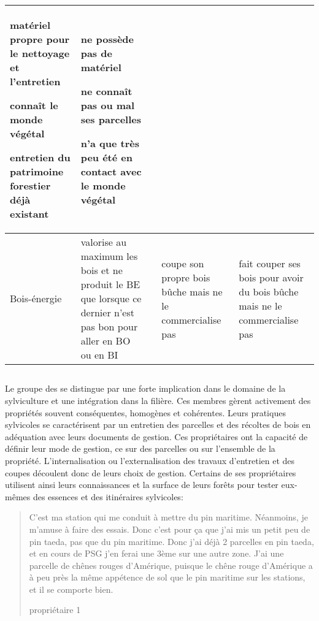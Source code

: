 \documentclass[12pt]{report}
\newcounter{table1}
\begin{document}
\begin{sidewaystable}
\begin{tabulary}{\columnwidth}{|p{28mm}|p{45mm}|p{45mm}|p{45mm}|p{45mm}|}
      \begin{compactitem}%
	\item matériel propre pour le nettoyage et l'entretien%
	\item connaît le monde végétal%
	\item entretien du patrimoine forestier déjà existant
      \end{compactitem}&%
      \begin{compactitem}%
	\item ne possède pas de matériel%
	\item ne connaît pas ou mal ses parcelles%
	\item n'a que très peu été en contact avec le monde végétal%
      \end{compactitem}\\%
    \hline Bois-énergie & valorise au maximum les bois et ne produit le BE que %
      lorsque ce dernier n'est pas bon pour aller en BO ou en BI&%
      &coupe son propre bois bûche mais ne le commercialise pas%
      &fait couper ses bois pour avoir du bois bûche mais ne le commercialise pas\\%
    \hline
  \end{tabulary}
\end{sidewaystable}

\subsection{}

Le groupe des  se distingue par une forte implication
dans le domaine de la sylviculture et une intégration dans la filière. Ces
membres gèrent activement des propriétés souvent conséquentes, homogènes et
cohérentes. Leurs pratiques sylvicoles se caractérisent par un entretien des
parcelles et des récoltes de bois en adéquation avec leurs documents de gestion.
Ces propriétaires ont la capacité de définir leur mode de gestion, ce sur des
parcelles ou sur l'ensemble de la propriété. L'internalisation ou
l'externalisation des travaux d'entretien et des coupes découlent donc de leurs
choix de gestion. Certains de ses propriétaires utilisent ainsi
leurs connaissances et la surface de leurs forêts pour tester eux-mêmes des
essences et des itinéraires sylvicoles:

\blockquote[propriétaire 1]{C’est ma
station qui me conduit à mettre du pin maritime. Néanmoins, je m’amuse à
faire des essais. Donc c’est pour ça que j’ai mis un petit peu de
pin taeda, pas que du pin maritime. Donc j’ai déjà 2 parcelles en pin taeda, et
en cours de PSG j’en ferai une 3ème sur une autre zone. J’ai une parcelle de
chênes rouges d’Amérique, puisque le chêne rouge d’Amérique a à peu près la même
appétence de sol que le pin maritime sur les stations, et il se comporte bien.}
\end{document}
